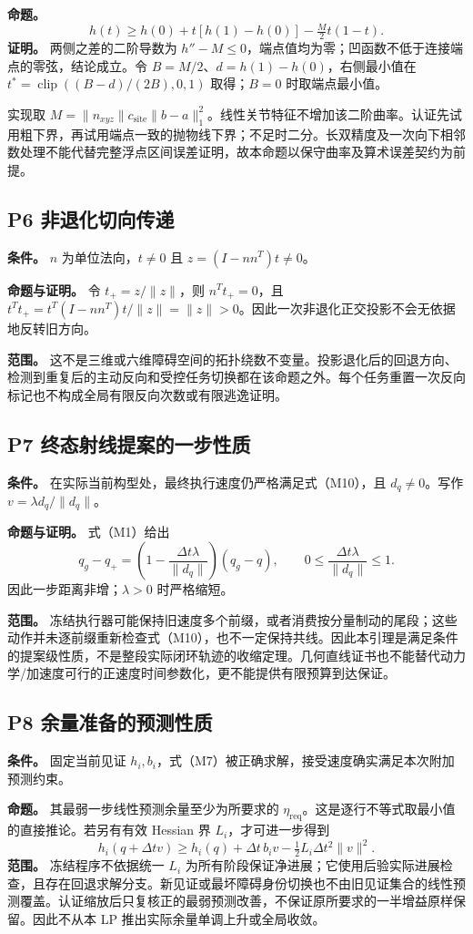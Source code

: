 \textbf{命题。}
\[
 h(t)\ge h(0)+t[h(1)-h(0)]-\tfrac M2t(1-t).
\]
\textbf{证明。} 两侧之差的二阶导数为 $h''-M\le0$，端点值均为零；凹函数不低于连接端点的零弦，结论成立。令 $B=M/2$、$d=h(1)-h(0)$，右侧最小值在 $t^*=\operatorname{clip}((B-d)/(2B),0,1)$ 取得；$B=0$ 时取端点最小值。

实现取 $M=\|n_{xyz}\|c_{\mathrm{site}}\|b-a\|_1^2$。线性关节特征不增加该二阶曲率。认证先试用粗下界，再试用端点一致的抛物线下界；不足时二分。长双精度及一次向下相邻数处理不能代替完整浮点区间误差证明，故本命题以保守曲率及算术误差契约为前提。

\subsection{P6 非退化切向传递}
\textbf{条件。} $n$ 为单位法向，$t\ne0$ 且 $z=(I-nn^T)t\ne0$。

\textbf{命题与证明。} 令 $t_+=z/\|z\|$，则 $n^Tt_+=0$，且 $t^Tt_+=t^T(I-nn^T)t/\|z\|=\|z\|>0$。因此一次非退化正交投影不会无依据地反转旧方向。

\textbf{范围。} 这不是三维或六维障碍空间的拓扑绕数不变量。投影退化后的回退方向、检测到重复后的主动反向和受控任务切换都在该命题之外。每个任务重置一次反向标记也不构成全局有限反向次数或有限逃逸证明。

\subsection{P7 终态射线提案的一步性质}
\textbf{条件。} 在实际当前构型处，最终执行速度仍严格满足式（M10），且 $d_q\ne0$。写作 $v=\lambda d_q/\|d_q\|$。

\textbf{命题与证明。} 式（M1）给出
\[
 q_g-q_+=\left(1-\frac{\Delta t\lambda}{\|d_q\|}\right)(q_g-q),
 \qquad 0\le\frac{\Delta t\lambda}{\|d_q\|}\le1.
\]
因此一步距离非增；$\lambda>0$ 时严格缩短。

\textbf{范围。} 冻结执行器可能保持旧速度多个前缀，或者消费按分量制动的尾段；这些动作并未逐前缀重新检查式（M10），也不一定保持共线。因此本引理是满足条件的提案级性质，不是整段实际闭环轨迹的收缩定理。几何直线证书也不能替代动力学/加速度可行的正速度时间参数化，更不能提供有限预算到达保证。

\subsection{P8 余量准备的预测性质}
\textbf{条件。} 固定当前见证 $h_i,b_i$，式（M7）被正确求解，接受速度确实满足本次附加预测约束。

\textbf{命题。} 其最弱一步线性预测余量至少为所要求的 $\eta_{\mathrm{req}}$。这是逐行不等式取最小值的直接推论。若另有有效 Hessian 界 $L_i$，才可进一步得到
\[
 h_i(q+\Delta t v)\ge h_i(q)+\Delta t\,b_i v-\tfrac12L_i\Delta t^2\|v\|^2.
\]
\textbf{范围。} 冻结程序不依据统一 $L_i$ 为所有阶段保证净进展；它使用后验实际进展检查，且存在回退求解分支。新见证或最坏障碍身份切换也不由旧见证集合的线性预测覆盖。认证缩放后只复核正的最弱预测改善，不保证原所要求的一半增益原样保留。因此不从本 LP 推出实际余量单调上升或全局收敛。

